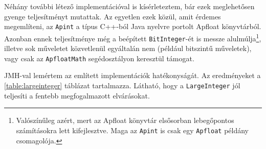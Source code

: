 \documentclass[
    parspace,
    noindent,
    nohyp,
]{elteiktdk}[2023/04/10]
\begin{document}
Néhány további létező implementációval is kísérleteztem,
bár ezek meglehetősen gyenge teljesítményt mutattak.
Az egyetlen ezek közül, amit érdemes megemlíteni,
az \texttt{Apint} a típus C++-ból Java nyelvre portolt Apfloat könyvtárból.
Azonban ennek teljesítménye még a beépített \texttt{BitInteger}-ét is messze alulmúlja\footnote{
    Valószínűleg azért, mert az Apfloat könyvtár elsősorban lebegőpontos számításokra lett kifejlesztve.
    Maga az \texttt{Apint} is csak egy \texttt{Apfloat} példány csomagolója.
},
illetve sok műveletet közvetlenül egyáltalán nem (például bitszintű műveletek),
vagy csak az \texttt{ApfloatMath} segédosztályon keresztül támogat.

JMH-val lemértem az említett implementációk hatékonyságát.
Az eredményeket a \ref{table:largeinteger} táblázat tartalmazza.
Látható, hogy a \texttt{LargeInteger} jól teljesíti a fentebb megfogalmazott elvárásokat.
\end{document}
